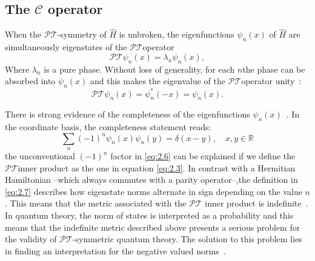 \documentclass[12pt, a4paper]{report}
\newcommand\PT{\(\mathcal{PT}\)}
\begin{document}
\subsection{The $\mathcal{C}$ operator}\label{CC}
When the \PT-symmetry of $\hat{H}$ is unbroken, the eigenfunctions $\psi_n(x)$ of $\hat{H}$ are simultaneously eigenstates of the \PT\:operator~\cite{Bender_2004}
\begin{equation}\label{eq:2.4}
\mathcal{PT}\psi_n(x) = \lambda_n \psi_n(x),
\end{equation}
Where $\lambda_n$ is a pure phase. Without loss of generality, for each $n$\:the phase can be absorbed into $\psi_n(x)$ and this makes the eigenvalue of the \PT operator unity~\cite{Bender_2004}: 
\begin{equation}\label{eq:2.5}
\mathcal{PT}\psi_n(x) = \psi_{n}^{*}(-x) = \psi_n(x).
\end{equation}

There is strong evidence of the completeness of the eigenfunctions $\psi_n(x)$~\cite{ComplexExtension, Bender_2004, Brody_2013}. In the coordinate basis, the completeness statement reads:
\begin{equation}\label{eq:2.6}
\sum_{n}(-1)^{n}\psi_n(x)\psi_n(y) = \delta(x-y),\quad x, y \in \mathbb{R}
\end{equation}
the unconventional $(-1)^n$ factor in \ref{eq:2.6} can be explained if we define the \PT\:inner product as the one in equation \ref{eq:2.3}. In contrast with a Hermitian Hamiltonian --which always commutes with a parity operator--,the definition in \ref{eq:2.7} describes how eigenstate norms alternate in sign depending on the value $n$. 
This means that the metric associated with the \PT\: inner product is indefinite~\cite{Bender_2004,Critique}.
In quantum theory, the norm of states is interpreted as a probability and this means that the indefinite metric described above presents a serious problem for the validity of \PT-symmetric quantum theory. The solution to this problem lies in finding an interpretation for the negative valued norms~\cite{PTsymmetricQM}.
\end{document}
